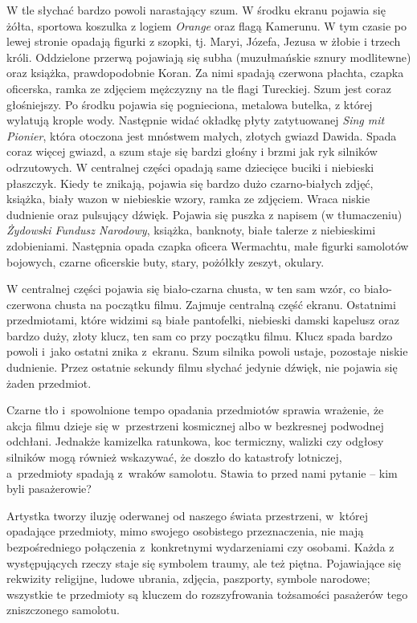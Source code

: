 \documentclass[14pt]{extarticle}
\begin{document}
W tle słychać bardzo powoli narastający szum. W środku ekranu pojawia się żółta, sportowa koszulka z logiem \textit{Orange} oraz flagą Kamerunu. W tym czasie po lewej stronie opadają figurki z szopki, tj. Maryi, Józefa, Jezusa w żłobie i trzech króli. Oddzielone przerwą pojawiają się subha (muzułmańskie sznury modlitewne) oraz książka, prawdopodobnie Koran. Za nimi spadają czerwona płachta, czapka oficerska, ramka ze zdjęciem mężczyzny na tle flagi Tureckiej. Szum jest coraz głośniejszy. Po środku pojawia się pognieciona, metalowa butelka, z której wylatują krople wody. Następnie widać okładkę płyty zatytuowanej \textit{Sing mit Pionier}, która otoczona jest mnóstwem małych, złotych gwiazd Dawida. Spada coraz więcej gwiazd, a szum staje się bardzi głośny i brzmi jak ryk silników odrzutowych. W centralnej części opadają same dziecięce buciki i niebieski płaszczyk. Kiedy te znikają, pojawia się bardzo dużo czarno-białych zdjęć, książka, biały wazon w niebieskie wzory, ramka ze zdjęciem. Wraca niskie dudnienie oraz pulsujący dźwięk. Pojawia się puszka z napisem (w tłumaczeniu) \textit{Żydowski Fundusz Narodowy}, książka, banknoty, białe talerze z niebieskimi zdobieniami. Następnia opada czapka oficera Wermachtu, małe figurki samolotów bojowych, czarne oficerskie buty, stary, pożółkły zeszyt, okulary. 

W centralnej części pojawia się biało-czarna chusta, w ten sam wzór, co biało-czerwona chusta na początku filmu. Zajmuje centralną część ekranu. Ostatnimi przedmiotami, które widzimi są białe pantofelki, niebieski damski kapelusz oraz bardzo duży, złoty klucz, ten sam co przy początku filmu. Klucz spada bardzo powoli i~jako ostatni znika z~ekranu. Szum silnika powoli ustaje, pozostaje niskie dudnienie. Przez ostatnie sekundy filmu słychać jedynie dźwięk, nie pojawia się żaden przedmiot.

Czarne tło i~spowolnione tempo opadania przedmiotów sprawia wrażenie, że akcja filmu dzieje się w~przestrzeni kosmicznej albo w bezkresnej podwodnej odchłani. Jednakże kamizelka ratunkowa, koc termiczny, walizki czy odgłosy silników mogą również wskazywać, że doszło do katastrofy lotniczej, a~przedmioty spadają z~wraków samolotu. Stawia to przed nami pytanie -- kim byli pasażerowie? 

Artystka tworzy iluzję oderwanej od naszego świata przestrzeni, w~której opadające przedmioty, mimo swojego osobistego przeznaczenia, nie mają bezpośredniego połączenia z~konkretnymi wydarzeniami czy osobami. Każda z występujących rzeczy staje się symbolem traumy, ale też piętna. Pojawiające się rekwizity religijne, ludowe ubrania, zdjęcia, paszporty, symbole narodowe; wszystkie te przedmioty są kluczem do rozszyfrowania tożsamości pasażerów tego zniszczonego samolotu.
\end{document}
